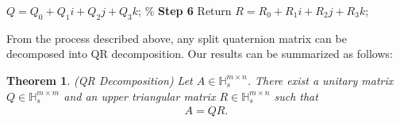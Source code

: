 \documentclass[3p]{elsarticle}
\newtheorem{theorem}{Theorem}[section]
\numberwithin{equation}{section}
\begin{document}
\begin{algorithm}[htbp]
\begin{algorithmic}[1]
        \State $Q = Q_0 + Q_1i + Q_2j + Q_3k$; \qquad\qquad\qquad\qquad\qquad\qquad\qquad\% \textbf{Step 6} Return
        \State $R = R_0 + R_1i + R_2j + R_3k$;
    \End 
    \end{algorithmic}
\end{algorithm}

From the process described above,  any split quaternion matrix can be decomposed into QR decomposition. Our results can be summarized as follows:
\begin{theorem}(QR Decomposition)
    Let $A \in \mathbb{H}_s^{m \times n}$. There exist a unitary matrix $Q \in \mathbb{H}_s^{m \times m}$ and an upper triangular matrix $R \in \mathbb{H}_s^{m \times n}$ such that
    \begin{eqnarray}\label{eq:split QR}
        A = Q R.
    \end{eqnarray}
\end{theorem}

\end{document}
